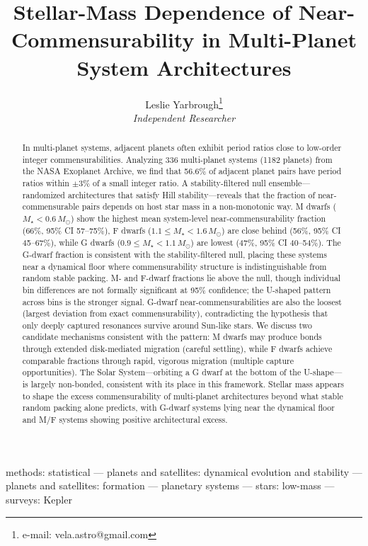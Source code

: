 \documentclass[twocolumn,usenatbib]{mnras}
\title[]{Stellar-Mass Dependence of Near-Commensurability in Multi-Planet
System Architectures}
\author[]{Leslie Yarbrough\thanks{e-mail: vela.astro@gmail.com}
\\[4pt]
\textit{Independent Researcher}}
\begin{document}
\label{firstpage}

\maketitle

\begin{abstract}
In multi-planet systems, adjacent planets often exhibit period ratios close to
low-order integer commensurabilities. Analyzing 336 multi-planet systems (1182
planets) from the NASA Exoplanet Archive, we find that 56.6\% of adjacent
planet pairs have period ratios within $\pm 3\%$ of a small integer ratio. A
stability-filtered null ensemble---randomized architectures that satisfy Hill
stability---reveals that the fraction of near-commensurable pairs depends on
host star mass in a non-monotonic way. M dwarfs
($M_\star < 0.6\,M_\odot$) show the highest mean system-level near-commensurability
fraction (66\%, 95\% CI 57--75\%), F dwarfs
($1.1 \leq M_\star < 1.6\,M_\odot$) are
close behind (56\%, 95\% CI 45--67\%), while G dwarfs
($0.9 \leq M_\star < 1.1\,M_\odot$) are lowest (47\%, 95\% CI 40--54\%).
The G-dwarf fraction is consistent with the stability-filtered null, placing
these systems near a dynamical floor where commensurability structure is
indistinguishable from random stable packing. M- and F-dwarf fractions lie
above the null, though individual bin differences are not formally significant
at 95\% confidence; the U-shaped pattern across bins is the stronger signal.
G-dwarf near-commensurabilities are also the loosest (largest deviation from
exact commensurability), contradicting the hypothesis that only deeply captured
resonances survive around Sun-like stars. We discuss two candidate mechanisms
consistent with the pattern: M dwarfs may produce bonds through extended
disk-mediated migration (careful settling), while F dwarfs achieve comparable
fractions through rapid, vigorous migration (multiple capture opportunities).
The Solar System---orbiting a G dwarf at the bottom of the U-shape---is largely
non-bonded, consistent with its place in this framework. Stellar mass appears to
shape the excess commensurability of multi-planet architectures beyond what
stable random packing alone predicts, with G-dwarf systems lying near the
dynamical floor and M/F systems showing positive architectural excess.
\end{abstract}

\begin{keywords}
methods: statistical --- planets and satellites: dynamical evolution and
stability --- planets and satellites: formation --- planetary systems ---
stars: low-mass --- surveys: Kepler
\end{keywords}
\end{document}
